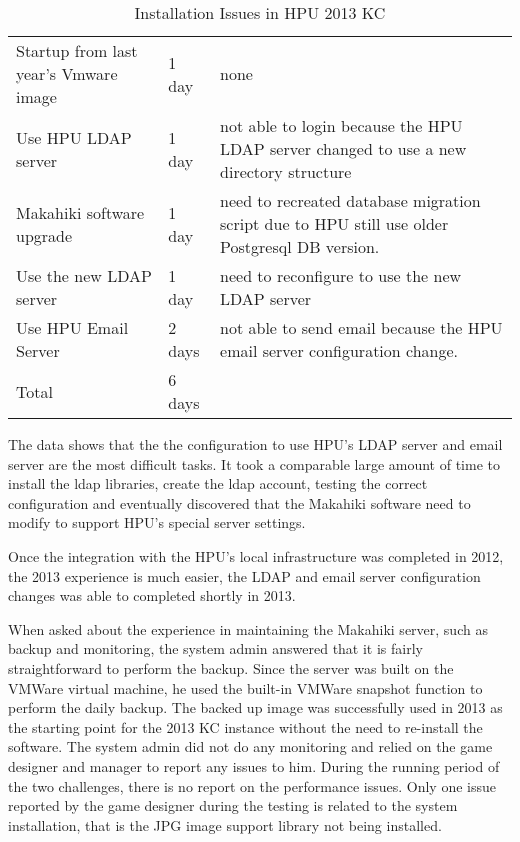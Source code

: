 \begin{table}[ht!]
  \centering
  \begin{tabular}{|P{0.28\columnwidth}|P{0.1\columnwidth}|p{0.5\columnwidth}|}
    \hline
      &
      &
      \\
    \hline
     Startup from last year's Vmware image & 1 day &  none\\
    \hline
    Use HPU LDAP server & 1 day  & not able to login because the HPU LDAP server changed to use a new directory structure \\
    \hline
     Makahiki software upgrade & 1 day & need to recreated database migration script due to HPU still use older Postgresql DB version. \\
    \hline
     Use the new LDAP server &  1 day &  need to reconfigure to use the new LDAP server\\
    \hline
    Use HPU Email Server & 2 days & not able to send email because the HPU email server configuration change. \\
    \hline
    Total & 6 days & \\
    \hline \end{tabular}
  \caption{Installation Issues in HPU 2013 KC }
  \label{fig:makahiki-install-hpu2013}
\end{table}

The data shows that the the configuration to use HPU's LDAP server and email server are the most difficult tasks. It took a comparable large amount of time to install the ldap libraries, create the ldap account, testing the correct configuration and eventually discovered that the Makahiki software need to modify to support HPU's special server settings. 

Once the integration with the HPU's local infrastructure was completed in 2012, the 2013 experience is much easier, the LDAP and email server configuration changes was able to completed shortly in 2013.

When asked about the experience in maintaining the Makahiki server, such as backup and monitoring, the system admin answered that it is fairly straightforward to perform  the backup.  Since the server was built on the VMWare virtual machine, he used the built-in VMWare snapshot function to perform the daily backup. The backed up image was successfully used in 2013 as the starting point for the 2013 KC instance without the need to re-install the software. The system admin did not do any monitoring and relied on the game designer and manager to report any issues to him. During the running period of the two challenges, there is no report on the performance issues. Only one issue reported by the game designer during the testing is related to the system installation, that is the JPG image support library not being installed.

